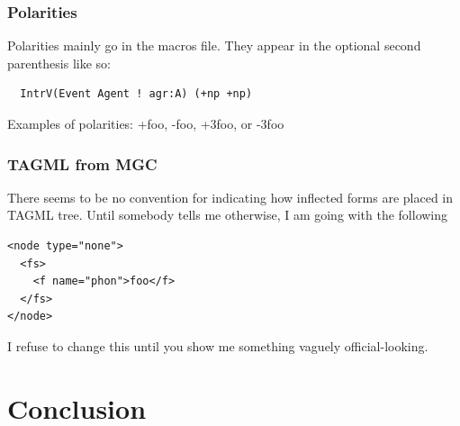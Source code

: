 \documentclass[11pt]{article}
\begin{document}
\subsubsection{Polarities}

Polarities mainly go in the macros file.  They appear in the optional
second parenthesis like so:

\begin{verbatim}
  IntrV(Event Agent ! agr:A) (+np +np)
\end{verbatim}

Examples of polarities: +foo, -foo, +3foo, or -3foo

\subsubsection{TAGML from MGC}

There seems to be no convention for indicating how inflected 
forms are placed in TAGML tree.  Until somebody tells me 
otherwise, I am going with the following

\begin{verbatim}
<node type="none">
  <fs>
    <f name="phon">foo</f>
  </fs>
</node>
\end{verbatim}

I refuse to change this until you show me something vaguely
official-looking.


\section{Conclusion}

\end{document}
